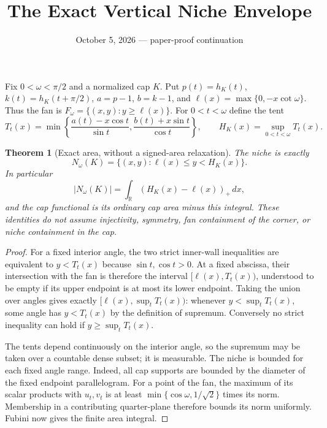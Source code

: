 \documentclass[11pt]{article}
\title{The Exact Vertical Niche Envelope}
\author{}\date{October 5, 2026 --- paper-proof continuation}
\newtheorem{theorem}{Theorem}
\begin{document}
\maketitle
Fix $0<\omega<\pi/2$ and a normalized cap $K$. Put $p(t)=h_K(t)$, $k(t)=h_K(t+\pi/2)$, $a=p-1$, $b=k-1$, and $\ell(x)=\max\{0,-x\cot\omega\}$. Thus the fan is $F_\omega=\{(x,y):y\ge\ell(x)\}$. For $0<t<\omega$ define the tent
\[
 T_t(x)=\min\left\{\frac{a(t)-x\cos t}{\sin t},\frac{b(t)+x\sin t}{\cos t}\right\},\qquad
 H_K(x)=\sup_{0<t<\omega}T_t(x).
\]

\begin{theorem}[Exact area, without a signed-area relaxation]
The niche is exactly
\[
 N_\omega(K)=\{(x,y):\ell(x)\le y<H_K(x)\}.
\]
In particular
\[
 |N_\omega(K)|=\int_{\mathbb R}(H_K(x)-\ell(x))_+\,dx,
\]
and the cap functional is its ordinary cap area minus this integral. These identities do not assume injectivity, symmetry, fan containment of the corner, or niche containment in the cap.
\end{theorem}
\begin{proof}
For a fixed interior angle, the two strict inner-wall inequalities are equivalent to $y<T_t(x)$ because $\sin t,\cos t>0$. At a fixed abscissa, their intersection with the fan is therefore the interval $[\ell(x),T_t(x))$, understood to be empty if its upper endpoint is at most its lower endpoint. Taking the union over angles gives exactly $[\ell(x),\sup_tT_t(x))$: whenever $y<\sup_tT_t(x)$, some angle has $y<T_t(x)$ by the definition of supremum. Conversely no strict inequality can hold if $y\ge\sup_tT_t(x)$.

The tents depend continuously on the interior angle, so the supremum may be taken over a countable dense subset; it is measurable. The niche is bounded for each fixed angle range. Indeed, all cap supports are bounded by the diameter of the fixed endpoint parallelogram. For a point of the fan, the maximum of its scalar products with $u_t,v_t$ is at least $\min\{\cos\omega,1/\sqrt2\}$ times its norm. Membership in a contributing quarter-plane therefore bounds its norm uniformly. Fubini now gives the finite area integral.
\end{proof}
\end{document}
